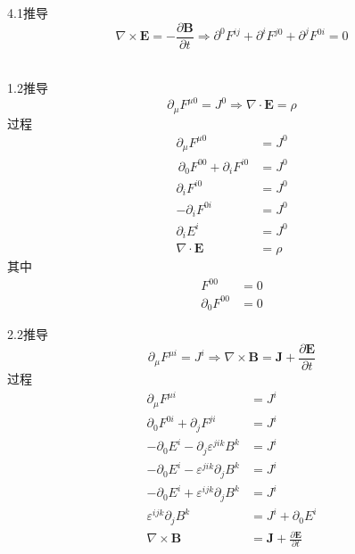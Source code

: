 4.1推导
\begin{equation}
    \nabla \times \mathbf{E}=-\frac{\partial \mathbf{B}}{\partial t}\Rightarrow \partial ^0F^{ij}+\partial ^iF^{j0}+\partial ^jF^{0i}=0
\end{equation}

\begin{equation}
    \begin{aligned}
        
    \end{aligned}
\end{equation}



1.2推导
\begin{equation}
    \partial _{\mu}F^{\mu 0}=J^0\Rightarrow \nabla \cdot \mathbf{E}=\rho 
\end{equation}
过程
\begin{equation}
    \begin{aligned}
        \partial _{\mu}F^{\mu 0}&=J^0
\\
\,\partial _0F^{00}+\partial _iF^{i0}&=J^0
\\
\partial _iF^{i0}&=J^0
\\
-\partial _iF^{0i}&=J^0
\\
\partial _iE^i&=J^0
\\
\nabla \cdot \mathbf{E}&=\rho 
    \end{aligned}
\end{equation}
其中
\begin{equation}
    \begin{aligned}
        F^{00}&=0
\\
\partial _0F^{00}&=0
    \end{aligned}
\end{equation}




2.2推导
\begin{equation}
    \partial _{\mu}F^{\mu i}=J^i\Rightarrow \nabla \times \mathbf{B}=\mathbf{J}+\frac{\partial \mathbf{E}}{\partial t}
\end{equation}
过程
\begin{equation}
    \begin{aligned}
        \partial _{\mu}F^{\mu i}&=J^i
\\
\partial _0F^{0i}+\partial _jF^{ji}&=J^i
\\
-\partial _0E^i-\partial _j\varepsilon ^{jik}B^k&=J^i
\\
-\partial _0E^i-\varepsilon ^{jik}\partial _jB^k&=J^i
\\
-\partial _0E^i+\varepsilon ^{ijk}\partial _jB^k&=J^i
\\
\varepsilon ^{ijk}\partial _jB^k&=J^i+\partial _0E^i
\\
\nabla \times \mathbf{B}&=\mathbf{J}+\frac{\partial \mathbf{E}}{\partial t}
    \end{aligned}
\end{equation}




